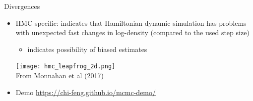 \documentclass[finnish,english,t]{beamer}
\begin{document}
\begin{frame}{Divergences}

    \vspace{-0.25\baselineskip}
  \begin{itemize}
  \item HMC specific: indicates that Hamiltonian dynamic simulation
    has problems with unexpected fast changes in log-density (compared
    to the used step size)
    \begin{itemize}
    \item indicates possibility of biased estimates
    \end{itemize}
    \vspace{0.25\baselineskip}
      \texttt{[image: hmc\_leapfrog\_2d.png]}\\
  {\footnotesize From Monnahan et al (2017)}
    \vspace{0.25\baselineskip}
    \item<2-> Demo \url{https://chi-feng.github.io/mcmc-demo/}
    \end{itemize}
  \end{frame}


\end{document}
